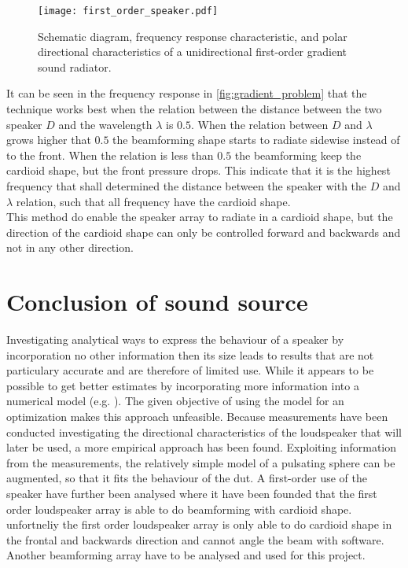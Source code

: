 \begin{figure}[H]
	\centering
	\texttt{[image: first\_order\_speaker.pdf]}
	\caption{Schematic diagram, frequency response characteristic, and polar directional characteristics of a unidirectional first-order gradient sound radiator. \citep{olson1973gradient}}
		\label{fig:gradient_problem}
\end{figure}

It can be seen in the frequency response in \autoref{fig:gradient_problem} that the technique works best when the relation between the distance between the two speaker $D$ and the wavelength $\lambda$ is $0.5$. When the relation between $D$ and $\lambda$ grows higher that $0.5$ the beamforming shape starts to radiate sidewise instead of to the front. When the relation is less than $0.5$ the beamforming keep the cardioid shape, but the front pressure drops. This indicate that it is the highest frequency that shall determined the distance between the speaker with the $D$ and $\lambda$ relation, such that all frequency have the cardioid shape.\\ 

This method do enable the speaker array to radiate in a cardioid shape, but the direction of the cardioid shape can only be controlled forward and backwards and not in any other direction.

\section{Conclusion of sound source}
Investigating analytical ways to express the behaviour of a speaker by incorporation no other information then its size leads to results that are not particulary accurate and are therefore of limited use. While it appears to be possible to get better estimates by incorporating more information into a numerical model (e.g. \citep{vanderkooy10}). The given objective of using the model for an optimization makes this approach unfeasible. Because measurements have been conducted investigating the directional characteristics of the loudspeaker that will later be used, a more empirical approach has been found. Exploiting information from the measurements, the relatively simple model of a pulsating sphere can be augmented, so that it fits the behaviour of the \gls{dut}. A first-order use of the speaker have further been analysed where it have been founded that the first order loudspeaker array is able to do beamforming with cardioid shape. unfortneliy the first order loudspeaker array is only able to do cardioid shape in the frontal and backwards direction and cannot angle the beam with software. Another beamforming array have to be analysed and used for this project.